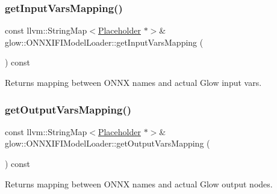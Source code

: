 \subsubsection{\texorpdfstring{get\+Input\+Vars\+Mapping()}{getInputVarsMapping()}}
{\footnotesize\ttfamily const llvm\+::\+String\+Map$<$\hyperlink{classglow_1_1_placeholder}{Placeholder} $\ast$$>$\& glow\+::\+O\+N\+N\+X\+I\+F\+I\+Model\+Loader\+::get\+Input\+Vars\+Mapping (\begin{DoxyParamCaption}{ }\end{DoxyParamCaption}) const\hspace{0.3cm}{\ttfamily [inline]}}

\begin{DoxyReturn}{Returns}
mapping between O\+N\+NX names and actual Glow input vars. 
\end{DoxyReturn}
\mbox{\label{classglow_1_1_o_n_n_x_i_f_i_model_loader_a67e7b300f2c54583abeae36d53b5a51f}} 
\subsubsection{\texorpdfstring{get\+Output\+Vars\+Mapping()}{getOutputVarsMapping()}}
{\footnotesize\ttfamily const llvm\+::\+String\+Map$<$\hyperlink{classglow_1_1_placeholder}{Placeholder} $\ast$$>$\& glow\+::\+O\+N\+N\+X\+I\+F\+I\+Model\+Loader\+::get\+Output\+Vars\+Mapping (\begin{DoxyParamCaption}{ }\end{DoxyParamCaption}) const\hspace{0.3cm}{\ttfamily [inline]}}

\begin{DoxyReturn}{Returns}
mapping between O\+N\+NX names and actual Glow output nodes. 
\end{DoxyReturn}
\mbox{\label{classglow_1_1_o_n_n_x_i_f_i_model_loader_a8b1db52c069d59cf77865c6cae6af5cd}} 

